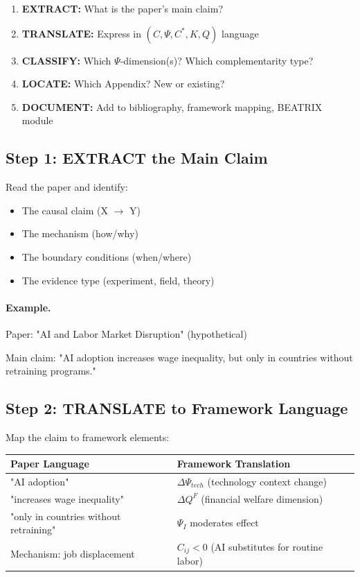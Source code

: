 \begin{tcolorbox}[colback=blue!5!white, colframe=blue!50!black, title=Five-Step Integration]
\begin{enumerate}
  \item \textbf{EXTRACT:} What is the paper's main claim?
  \item \textbf{TRANSLATE:} Express in $(C, \Psi, C^*, K, Q)$ language
  \item \textbf{CLASSIFY:} Which $\Psi$-dimension(s)? Which complementarity type?
  \item \textbf{LOCATE:} Which Appendix? New or existing?
  \item \textbf{DOCUMENT:} Add to bibliography, framework mapping, BEATRIX module
\end{enumerate}
\end{tcolorbox}

\subsection{Step 1: EXTRACT the Main Claim}

Read the paper and identify:
\begin{itemize}
  \item The causal claim (X $\to$ Y)
  \item The mechanism (how/why)
  \item The boundary conditions (when/where)
  \item The evidence type (experiment, field, theory)
\end{itemize}

\paragraph{Example.}
Paper: "AI and Labor Market Disruption" (hypothetical)

Main claim: "AI adoption increases wage inequality, but only in countries without 
retraining programs."

\subsection{Step 2: TRANSLATE to Framework Language}

Map the claim to framework elements:

\begin{center}
\renewcommand{\arraystretch}{1.3}
\begin{tabular}{|l|l|}
\hline
\textbf{Paper Language} & \textbf{Framework Translation} \\
\hline
"AI adoption" & $\Delta \Psi_{tech}$ (technology context change) \\
"increases wage inequality" & $\Delta Q^F$ (financial welfare dimension) \\
"only in countries without retraining" & $\Psi_I$ moderates effect \\
Mechanism: job displacement & $C_{ij} < 0$ (AI substitutes for routine labor) \\
\hline
\end{tabular}
\end{center}

